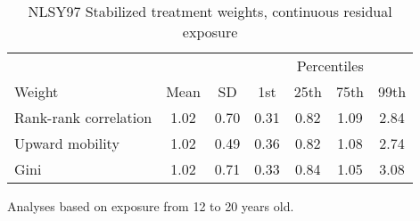 \begin{table}[htp]
\centering
\footnotesize
\setlength{\tabcolsep}{10pt}
\renewcommand{\arraystretch}{1}
\begin{threeparttable}
\centering
\caption{NLSY97 Stabilized treatment weights, continuous residual exposure} 
\label{tab:nlsy97_ipt_weigths_zr}
\begin{tabular}{lcccccc}
  \hline
\multicolumn{3}{c}{} & \multicolumn{4}{c}{Percentiles} \\ 
 \cmidrule{4-7} 
Weight & Mean & SD & 1st & 25th & 75th & 99th \\ 
  \hline
Rank-rank correlation & 1.02 & 0.70 & 0.31 & 0.82 & 1.09 & 2.84 \\ 
  Upward mobility & 1.02 & 0.49 & 0.36 & 0.82 & 1.08 & 2.74 \\ 
  Gini & 1.02 & 0.71 & 0.33 & 0.84 & 1.05 & 3.08 \\ 
   \hline
\end{tabular}
\begin{tablenotes}
\footnotesize
\item Analyses based on exposure from 12 to 20 years old. 
\end{tablenotes}
\end{threeparttable}
\end{table}
